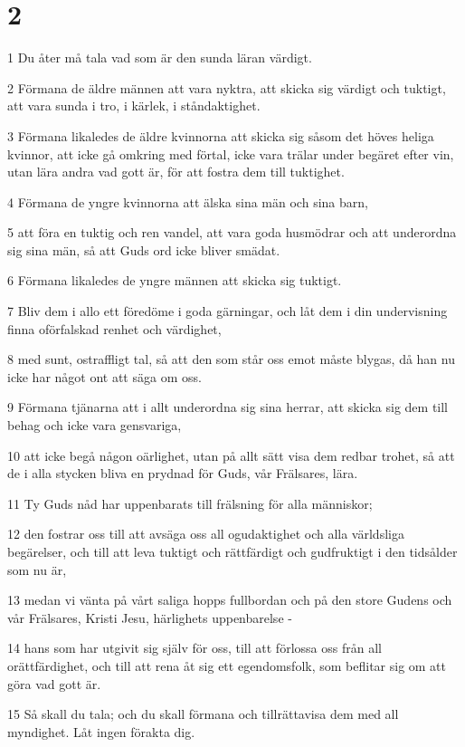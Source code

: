 \chapter{2}

\par 1 Du åter må tala vad som är den sunda läran värdigt.
\par 2 Förmana de äldre männen att vara nyktra, att skicka sig värdigt och tuktigt, att vara sunda i tro, i kärlek, i ståndaktighet.
\par 3 Förmana likaledes de äldre kvinnorna att skicka sig såsom det höves heliga kvinnor, att icke gå omkring med förtal, icke vara trälar under begäret efter vin, utan lära andra vad gott är, för att fostra dem till tuktighet.
\par 4 Förmana de yngre kvinnorna att älska sina män och sina barn,
\par 5 att föra en tuktig och ren vandel, att vara goda husmödrar och att underordna sig sina män, så att Guds ord icke bliver smädat.
\par 6 Förmana likaledes de yngre männen att skicka sig tuktigt.
\par 7 Bliv dem i allo ett föredöme i goda gärningar, och låt dem i din undervisning finna oförfalskad renhet och värdighet,
\par 8 med sunt, ostraffligt tal, så att den som står oss emot måste blygas, då han nu icke har något ont att säga om oss.
\par 9 Förmana tjänarna att i allt underordna sig sina herrar, att skicka sig dem till behag och icke vara gensvariga,
\par 10 att icke begå någon oärlighet, utan på allt sätt visa dem redbar trohet, så att de i alla stycken bliva en prydnad för Guds, vår Frälsares, lära.
\par 11 Ty Guds nåd har uppenbarats till frälsning för alla människor;
\par 12 den fostrar oss till att avsäga oss all ogudaktighet och alla världsliga begärelser, och till att leva tuktigt och rättfärdigt och gudfruktigt i den tidsålder som nu är,
\par 13 medan vi vänta på vårt saliga hopps fullbordan och på den store Gudens och vår Frälsares, Kristi Jesu, härlighets uppenbarelse -
\par 14 hans som har utgivit sig själv för oss, till att förlossa oss från all orättfärdighet, och till att rena åt sig ett egendomsfolk, som beflitar sig om att göra vad gott är.
\par 15 Så skall du tala; och du skall förmana och tillrättavisa dem med all myndighet. Låt ingen förakta dig.

